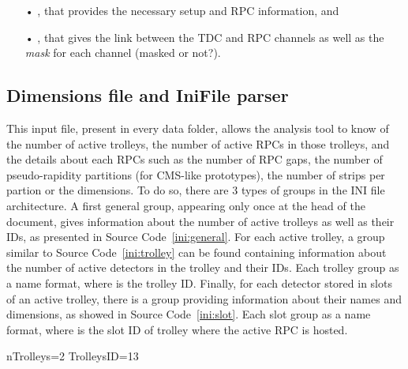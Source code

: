 	\begin{itemize}
		\item[•] , that provides the necessary setup and RPC information, and
		\item[•] , that gives the link between the TDC and RPC channels as well as the \textit{mask} for each channel (masked or not?).
	\end{itemize}
	
	\subsection{Dimensions file and IniFile parser}
	\label{app2:ssec:dimensions}
	
	This input file, present in every data folder, allows the analysis tool to know of the number of active trolleys, the number of active RPCs in those trolleys, and the details about each RPCs such as the number of RPC gaps, the number of pseudo-rapidity partitions (for CMS-like prototypes), the number of strips per partion or the dimensions. To do so, there are 3 types of groups in the INI file architecture. A first general group, appearing only once at the head of the document, gives information about the number of active trolleys as well as their IDs, as presented in Source Code~\ref{ini:general}. For each active trolley, a group similar to Source Code~\ref{ini:trolley} can be found containing information about the number of active detectors in the trolley and their IDs. Each trolley group as a  name format, where  is the trolley ID. Finally, for each detector stored in slots of an active trolley, there is a group providing information about their names and dimensions, as showed in Source Code~\ref{ini:slot}. Each slot group as a  name format, where  is the slot ID of trolley  where the active RPC is hosted.\\
	
	\begin{code}
	\begin{inicode}
[General]
nTrolleys=2
TrolleysID=13
	\end{inicode}
	\label{ini:general}
	\vspace{5mm}
	\end{code}
	
